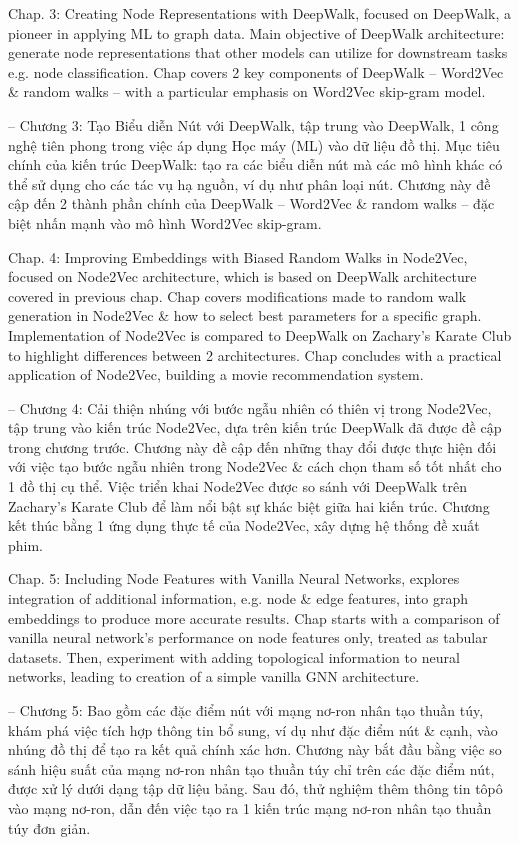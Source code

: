 \documentclass{article}
\begin{document}
\begin{itemize}
\begin{itemize}
        Chap. 3: Creating Node Representations with DeepWalk, focused on DeepWalk, a pioneer in applying ML to graph data. Main objective of DeepWalk architecture: generate node representations that other models can utilize for downstream tasks e.g. node classification. Chap covers 2 key components of DeepWalk -- Word2Vec \& random walks -- with a particular emphasis on Word2Vec skip-gram model.

        -- Chương 3: Tạo Biểu diễn Nút với DeepWalk, tập trung vào DeepWalk, 1 công nghệ tiên phong trong việc áp dụng Học máy (ML) vào dữ liệu đồ thị. Mục tiêu chính của kiến trúc DeepWalk: tạo ra các biểu diễn nút mà các mô hình khác có thể sử dụng cho các tác vụ hạ nguồn, ví dụ như phân loại nút. Chương này đề cập đến 2 thành phần chính của DeepWalk -- Word2Vec \& random walks -- đặc biệt nhấn mạnh vào mô hình Word2Vec skip-gram.

        Chap. 4: Improving Embeddings with Biased Random Walks in Node2Vec, focused on Node2Vec architecture, which is based on DeepWalk architecture covered in previous chap. Chap covers modifications made to random walk generation in Node2Vec \& how to select best parameters for a specific graph. Implementation of Node2Vec is compared to DeepWalk on Zachary's Karate Club to highlight differences between 2 architectures. Chap concludes with a practical application of Node2Vec, building a movie recommendation system.

        -- Chương 4: Cải thiện nhúng với bước ngẫu nhiên có thiên vị trong Node2Vec, tập trung vào kiến trúc Node2Vec, dựa trên kiến trúc DeepWalk đã được đề cập trong chương trước. Chương này đề cập đến những thay đổi được thực hiện đối với việc tạo bước ngẫu nhiên trong Node2Vec \& cách chọn tham số tốt nhất cho 1 đồ thị cụ thể. Việc triển khai Node2Vec được so sánh với DeepWalk trên Zachary's Karate Club để làm nổi bật sự khác biệt giữa hai kiến trúc. Chương kết thúc bằng 1 ứng dụng thực tế của Node2Vec, xây dựng hệ thống đề xuất phim.

        Chap. 5: Including Node Features with Vanilla Neural Networks, explores integration of additional information, e.g. node \& edge features, into graph embeddings to produce more accurate results. Chap starts with a comparison of vanilla neural network's performance on node features only, treated as tabular datasets. Then, experiment with adding topological information to neural networks, leading to creation of a simple vanilla GNN architecture.

        -- Chương 5: Bao gồm các đặc điểm nút với mạng nơ-ron nhân tạo thuần túy, khám phá việc tích hợp thông tin bổ sung, ví dụ như đặc điểm nút \& cạnh, vào nhúng đồ thị để tạo ra kết quả chính xác hơn. Chương này bắt đầu bằng việc so sánh hiệu suất của mạng nơ-ron nhân tạo thuần túy chỉ trên các đặc điểm nút, được xử lý dưới dạng tập dữ liệu bảng. Sau đó, thử nghiệm thêm thông tin tôpô vào mạng nơ-ron, dẫn đến việc tạo ra 1 kiến trúc mạng nơ-ron nhân tạo thuần túy đơn giản.


\end{itemize}
\end{itemize}
\end{document}
